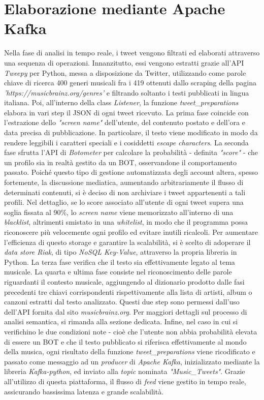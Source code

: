 \documentclass[12pt, a4paper, twocolumn]{article} %
\begin{document}
\section{Elaborazione mediante Apache Kafka}
Nella fase di analisi in tempo reale, i tweet vengono filtrati ed elaborati attraverso una sequenza di operazioni. Innanzitutto, essi vengono estratti grazie all'API \textit{Tweepy} per Python, messa a disposizione da Twitter, utilizzando come parole chiave di ricerca 400 generi musicali fra i 419 ottenuti dallo scraping della pagina \textit{'https://musicbrainz.org/genres'} e filtrando soltanto i testi pubblicati in lingua italiana. Poi, all'interno della class \textit{Listener}, la funzione \textit{tweet\_preparations} elabora in vari step il JSON di ogni tweet ricevuto. La prima fase coincide con l'estrazione dello \textit{"screen name"} dell'utente, del contenuto postato e dell'ora e data precisa di pubblicazione. In particolare, il testo viene modificato in modo da rendere leggibili i caratteri speciali e i cosiddetti \textit{escape characters}. La seconda fase sfrutta l'API di \textit{Botometer} per calcolare la probabilità - definita \textit{"score"} - che un profilo sia in realtà gestito da un BOT, osservandone il comportamento passato. Poiché questo tipo di gestione automatizzata degli account altera, spesso fortemente, la discussione mediatica, aumentando arbitrariamente il flusso di determinati contenuti, si è deciso di non archiviare i tweet appartenenti a tali profili. Nel dettaglio, se lo score associato all'utente di ogni tweet supera una soglia fissata al 90\%, lo \textit{screen name} viene memorizzato all'interno di una \textit{blacklist}, altrimenti smistato in una \textit{whitelist}, in modo che il programma possa riconoscere più velocemente ogni profilo ed evitare inutili ricalcoli. Per aumentare l'efficienza di questo storage e garantire la scalabilità, si è scelto di adoperare il \textit{data store Riak}, di tipo \textit{NoSQL Key-Value}, attraverso la propria libreria in Python. La terza fase verifica che il testo sia effettivamente legato al tema musicale. La quarta e ultima fase consiste nel riconoscimento delle parole riguardanti il contesto musicale, aggiungendo al dizionario prodotto dalle fasi precedenti tre chiavi corrispondenti rispettivamente alla lista di artisti, album o canzoni estratti dal testo analizzato. Questi due step sono permessi dall'uso dell'API fornita dal sito \textit{musicbrainz.org}. Per maggiori dettagli sul processo di analisi semantica, si rimanda alla sezione dedicata. Infine, nel caso in cui si verifichino le due condizioni note - cioè che l'utente non abbia probabilità elevata di essere un BOT e che il testo pubblicato si riferisca effettivamente al mondo della musica, ogni risultato della funzione \textit{tweet\_preparations} viene ricodificato e passato come messaggio ad un \textit{producer} di \textit{Apache Kafka}, inizializzato mediante la libreria \textit{Kafka-python}, ed inviato alla \textit{topic} nominata \textit{"Music\_Tweets"}. Grazie all'utilizzo di questa piattaforma, il flusso di \textit{feed} viene gestito in tempo reale, assicurando bassissima latenza e grande scalabilità. 
\end{document}
